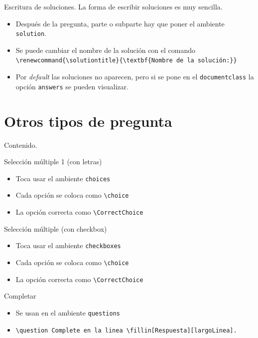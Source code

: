 \documentclass[dvipsnames,xcolor=x11names, handout]{beamer}
\theoremstyle{plain}
\theoremstyle{definition}
\begin{document}
\begin{frame}[fragile]{Escritura de soluciones.}
La forma de escribir soluciones es muy sencilla.

\begin{itemize}[<+->]
    \item Después de la pregunta, parte o subparte hay que poner el ambiente \verb!solution!.
    \item Se puede cambiar el nombre de la solución con el comando 
    \verb!\renewcommand{\solutiontitle}{\textbf{Nombre de la solución:}}!
    \item Por \textit{default} las soluciones no aparecen, pero si se pone en el \verb!documentclass! la opción \verb!answers! se pueden visualizar.
\end{itemize}
    
\end{frame}

\section{Otros tipos de pregunta}
\begin{frame}{Contenido.}
  \tableofcontents[currentsection]
\end{frame}

\begin{frame}[fragile]{Selección múltiple 1 (con letras)}
    \begin{itemize}[<+->]
        \item Toca usar el ambiente \verb!choices!
        \item Cada opción se coloca como \verb!\choice!
        \item La opción correcta como \verb!\CorrectChoice!
    \end{itemize}
\end{frame}
\begin{frame}[fragile]{Selección múltiple (con checkbox)}
    \begin{itemize}[<+->]
        \item Toca usar el ambiente \verb!checkboxes!
        \item Cada opción se coloca como \verb!\choice!
        \item La opción correcta como \verb!\CorrectChoice!
    \end{itemize}
\end{frame}
\begin{frame}[fragile]{Completar}
    \begin{itemize}[<+->]
        \item Se usan en el ambiente \verb!questions!
        \item 
        \begin{scriptsize}
        \verb!\question Complete en la linea \fillin[Respuesta][largoLinea].!
        \end{scriptsize}
    \end{itemize}
\end{frame}
\end{document}
